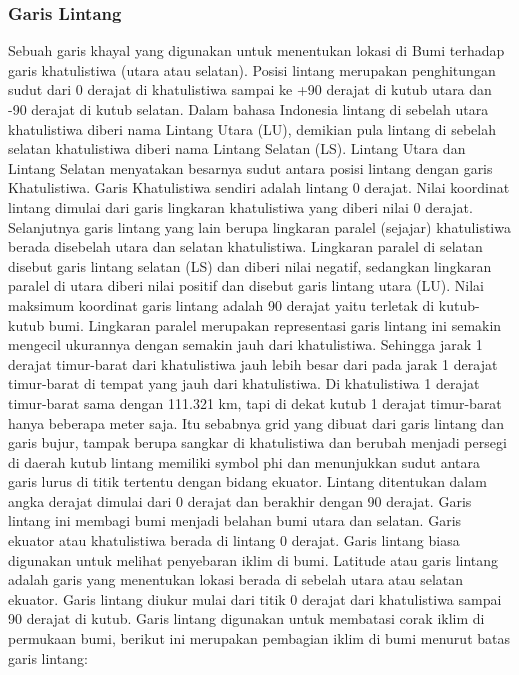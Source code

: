 \subsubsection{Garis Lintang}

Sebuah garis khayal yang digunakan untuk menentukan lokasi di Bumi terhadap garis khatulistiwa (utara atau selatan). Posisi lintang merupakan penghitungan sudut dari 0 derajat di khatulistiwa sampai ke +90 derajat di kutub utara dan -90 derajat di kutub selatan. Dalam bahasa Indonesia lintang di sebelah utara khatulistiwa diberi nama Lintang Utara (LU), demikian pula lintang di sebelah selatan khatulistiwa diberi nama Lintang Selatan (LS). Lintang Utara dan Lintang Selatan menyatakan besarnya sudut antara posisi lintang dengan garis Khatulistiwa. Garis Khatulistiwa sendiri adalah lintang 0 derajat. 
Nilai koordinat lintang dimulai dari garis lingkaran khatulistiwa yang diberi nilai 0 derajat. Selanjutnya garis lintang yang lain berupa lingkaran paralel (sejajar) khatulistiwa berada disebelah utara dan selatan khatulistiwa. Lingkaran paralel di selatan disebut garis lintang selatan (LS) dan diberi nilai negatif, sedangkan lingkaran paralel di utara diberi nilai positif dan disebut garis lintang utara (LU). Nilai maksimum koordinat garis lintang adalah 90 derajat yaitu terletak di kutub-kutub bumi. 
Lingkaran paralel merupakan representasi garis lintang ini semakin mengecil ukurannya dengan semakin jauh dari khatulistiwa. Sehingga jarak 1 derajat timur-barat dari khatulistiwa jauh lebih besar dari pada jarak 1 derajat timur-barat di tempat yang jauh dari khatulistiwa. Di khatulistiwa 1 derajat timur-barat sama dengan 111.321 km, tapi di dekat kutub 1 derajat timur-barat hanya beberapa meter saja. Itu sebabnya grid yang dibuat dari garis lintang dan garis bujur, tampak berupa sangkar di khatulistiwa dan berubah menjadi persegi di daerah kutub
lintang memiliki symbol phi dan menunjukkan sudut antara garis lurus di titik tertentu dengan bidang ekuator. Lintang ditentukan dalam angka derajat dimulai dari 0 derajat dan berakhir dengan 90 derajat. Garis lintang ini membagi bumi menjadi belahan bumi utara dan selatan. Garis ekuator atau khatulistiwa berada di lintang 0 derajat. Garis lintang biasa digunakan untuk melihat penyebaran iklim di bumi.
Latitude atau garis lintang adalah garis yang menentukan lokasi berada di sebelah utara atau selatan ekuator. Garis lintang diukur mulai dari titik 0 derajat dari khatulistiwa sampai 90 derajat di kutub. Garis lintang digunakan untuk membatasi corak iklim di permukaan bumi, berikut ini merupakan pembagian iklim di bumi menurut batas garis lintang:

